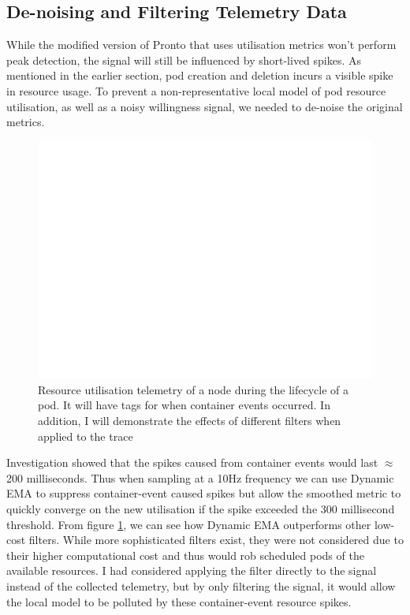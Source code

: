 \subsection{De-noising and Filtering Telemetry Data}
While the modified version of Pronto that uses utilisation metrics won't perform
peak detection, the signal will still be influenced by short-lived spikes. As
mentioned in the earlier section, pod creation and deletion incurs a visible
spike in resource usage. To prevent a non-representative local model of pod
resource utilisation, as well as a noisy willingness signal, we needed to de-noise
the original metrics.
\begin{figure}[h]
    \centering
    \includegraphics[width=\textwidth]{images/blank.pdf}
    \caption{Resource utilisation telemetry of a node during the lifecycle of a
    pod. It will have tags for when container events occurred. In addition, I
    will demonstrate the effects of different filters when applied to the
    trace}
    \label{utilisation-noise}
\end{figure}
Investigation showed that the spikes caused from container events would last
$\approx$200 milliseconds. Thus when sampling at a 10Hz frequency we can use
Dynamic EMA to suppress container-event caused spikes but allow the smoothed
metric to quickly converge on the new utilisation if the spike exceeded the 300
millisecond threshold. From figure \ref{utilisation-noise}, we can see how
Dynamic EMA outperforms other low-cost filters. While more sophisticated filters
exist, they were not considered due to their higher computational cost and thus
would rob scheduled pods of the available resources. I had considered applying
the filter directly to the signal instead of the collected telemetry, but by
only filtering the signal, it would allow the local model to be polluted by
these container-event resource spikes.

